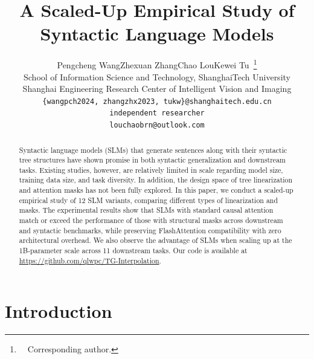 \documentclass[11pt]{article}
\title{A Scaled-Up Empirical Study of Syntactic Language Models}
\author{Pengcheng Wang\footnotemark[3]\footnotemark[4] \quad Zhexuan Zhang\footnotemark[3]\footnotemark[4] \quad Chao Lou\footnotemark[5] \quad Kewei Tu\footnotemark[3]\footnotemark[4]~\thanks{~~Corresponding author.} \\
\footnotemark[3]School of Information Science and Technology, ShanghaiTech University \\
\footnotemark[4]Shanghai Engineering Research Center of Intelligent Vision and Imaging\\
 \tt \{wangpch2024, zhangzhx2023, tukw\}@shanghaitech.edu.cn \\
\footnotemark[5]independent researcher \\
 \tt louchaobrn@outlook.com \\}
\begin{document}
\maketitle

\begin{abstract}
Syntactic language models (SLMs) that generate sentences along with their syntactic tree structures have shown promise in both syntactic generalization and downstream tasks. %
Existing studies, however, are relatively limited in scale regarding model size, training data size, and task diversity. In addition, the design space of tree linearization and attention masks has not been fully explored. In this paper, we conduct a scaled-up empirical study of 12 SLM variants, comparing different types of linearization and masks. 
The experimental results show that SLMs with standard causal attention match or exceed the performance of those with structural masks across downstream and syntactic benchmarks, while preserving FlashAttention compatibility with zero architectural overhead. 
We also observe the advantage of SLMs when scaling up at the 1B-parameter scale across 11 downstream tasks. Our code is available at \url{https://github.com/qlwpc/TG-Interpolation}.
\end{abstract}

\section{Introduction}
\end{document}
